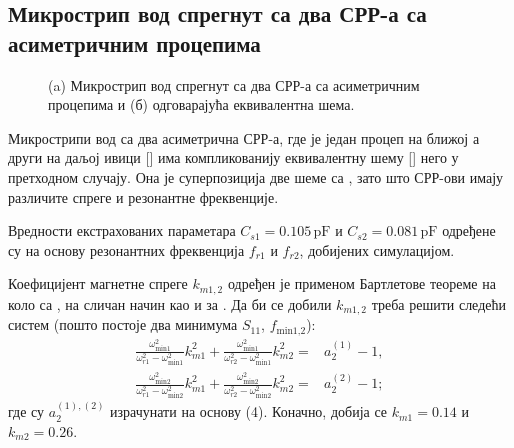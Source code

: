 \subsection{\label{sec:ML2SP}
Микрострип вод спрегнут са два СРР-а са асиметричним процепима}
\begin{figure}[!t]
\caption{(a) Микрострип вод спрегнут са два СРР-а са асиметричним процепима и (б) одговарајућа еквивалентна шема.}
\label{f6}
\end{figure}
Микрострипи вод са два асиметрична СРР-а, где је један процеп на ближој а други на даљој ивици [] има компликованију еквивалентну шему [] него у претходном случају. Она је суперпозиција две шеме са , зато што СРР-ови имају различите спреге и резонантне фреквенције. 

Вредности екстрахованих параметара $C_{s1}=0.105\, \mathrm{pF}$ и $C_{s2}=0.081\,
\mathrm{pF}$ одређене су на основу резонантних фреквенција $f_{r1}$ и $f_{r2}$, добијених симулацијом.

Коефицијент магнетне спреге $k_{m1,2}$  одређен је применом Бартлетове теореме на коло са , на сличан начин као и за . Да би се добили $k_{m1,2}$ треба решити следећи систем (пошто постоје два минимума $S_{11}$, $f_\text{min1,2}$):
\begin{equation}
\begin{split}
\frac{\omega_\text{min1}^2}{\omega_{r1}^2-\omega_\text{min1}^2}k_{m1}^2 +
\frac{\omega_\text{min1}^2}{\omega_{r2}^2-\omega_\text{min1}^2}k_{m2}^2 = & a_2^{(1)} -1, \\
\frac{\omega_\text{min2}^2}{\omega_{r1}^2-\omega_\text{min2}^2}k_{m1}^2 +
\frac{\omega_\text{min2}^2}{\omega_{r2}^2-\omega_\text{min2}^2}k_{m2}^2 = & a_2^{(2)} -1;
\end{split}
\end{equation}
где су $a_2^{(1),(2)}$ израчунати на основу (4). Коначно, добија се $k_{m1}=0.14$ и $k_{m2}=0.26$.

